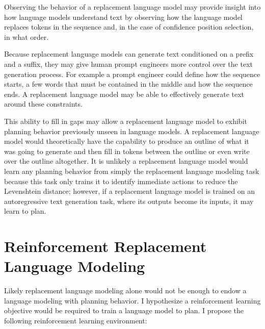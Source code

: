 \documentclass{article}
\begin{document}
Observing the behavior of a replacement language model may provide insight into how language models understand text by observing how the language model replaces tokens in the sequence and, in the case of confidence position selection, in what order.

Because replacement language models can generate text conditioned on a prefix and a suffix, they may give human prompt engineers more control over the text generation process. For example a prompt engineer could define how the sequence starts, a few words that must be contained in the middle and how the sequence ends. A replacement language model may be able to effectively generate text around these constraints.

This ability to fill in gaps may allow a replacement language model to exhibit planning behavior previously unseen in language models. A replacement language model would theoretically have the capability to produce an outline of what it was going to generate and then fill in tokens between the outline or even write over the outline altogether. It is unlikely a replacement language model would learn any planning behavior from simply the replacement language modeling task because this task only trains it to identify immediate actions to reduce the Levenshtein distance; however, if a replacement language model is trained on an autoregressive text generation task, where its outputs become its inputs, it may learn to plan.


\section{Reinforcement Replacement Language Modeling}

Likely replacement language modeling alone would not be enough to endow a language modeling with planning behavior. I hypothesize a reinforcement learning objective would be required to train a language model to plan. I propose the following reinforcement learning environment:
\end{document}
